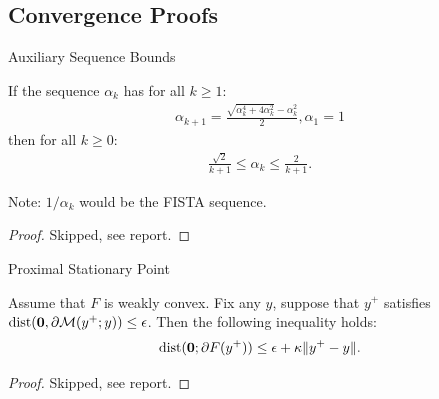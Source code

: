 \documentclass[11pt]{beamer}
\begin{document}
    \subsection{Convergence Proofs}
        \begin{frame}{Auxiliary Sequence Bounds}
            \begin{lemma}
                If the sequence $\alpha_k$ has for all $k\ge 1$: 
                \begin{align*}
                    \alpha_{k + 1} = \frac{\sqrt{\alpha_k^4 + 4\alpha_k^2} - \alpha_k^2}{2}, \alpha_1 = 1
                \end{align*}
                then for all $k \ge0$: 
                \begin{align*}
                    \frac{\sqrt{2}}{k + 1} \le \alpha_k \le \frac{2}{k + 1}. 
                \end{align*}    
            \end{lemma}
            Note: $1/\alpha_k$ would be the FISTA sequence. 
            \begin{proof}
                Skipped,  see report. 
            \end{proof}
        \end{frame}
        \begin{frame}{Proximal Stationary Point}
            \begin{lemma}[Lemma B.2]
                Assume that $F$ is weakly convex. 
                Fix any $y$, suppose that $y^+$ satisfies $\operatorname{dist}(\mathbf 0,\partial \mathcal M(y^+; y)) \le \epsilon$. Then the following inequality holds: 
                \begin{align*}
                    \operatorname{dist}(\mathbf 0; \partial F(y^+)) 
                    \le \epsilon + \kappa\Vert y^+ - y\Vert. 
                \end{align*}    
            \end{lemma}
            \begin{proof}
                Skipped, see report. 
            \end{proof}
        \end{frame}
\end{document}
